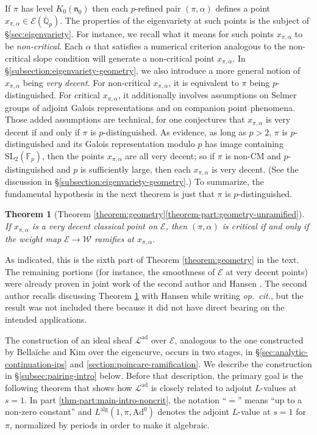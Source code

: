\documentclass[10pt, twoside]{amsart}
\theoremstyle{plain}
\newtheorem{theorem}{Theorem}
\theoremstyle{definition}
\theoremstyle{remark}
\numberwithin{equation}{subsection}
\def\F{\mathbb{F}}
\def\SL{\mathrm{SL}}
\def\Ad{\mathrm{Ad}}
\def\alg{\mathrm{alg}}
\def\ad{\operatorname{ad}}
\def\gn{\mathfrak n}
\def\scre{\mathscr E}
\def\scrl{\mathscr L}
\def\scrw{\mathscr W}
\def\qpbar{\overline{\mathbb Q}_p}
\begin{document}
If $\pi$ has level $K_0(\gn_0)$ then each $p$-refined pair $(\pi,\alpha)$ defines a point $x_{\pi,\alpha} \in \scre(\qpbar)$. The properties of the eigenvariety at such points is the subject of  \S\ref{sec:eigenvariety}. For instance, we recall what it means for such points $x_{\pi,\alpha}$ to be {\em non-critical}. Each $\alpha$ that satisfies a numerical criterion analogous to the non-critical slope condition will generate a non-critical point $x_{\pi,\alpha}$. In \S\ref{subsection:eigenvariety-geometry}, we also introduce a more general notion of $x_{\pi,\alpha}$ being {\em very decent}. For non-critical $x_{\pi,\alpha}$, it is equivalent to $\pi$ being $p$-distinguished. For critical $x_{\pi,\alpha}$, it additionally involves assumptions on Selmer groups of adjoint Galois representations and on companion point phenomena. Those added assumptions are technical, for one conjectures that $x_{\pi,\alpha}$ is very decent if and only if $\pi$ is $p$-distinguished. As evidence, as long as $p>2$, $\pi$ is $p$-distinguished and its Galois representation modulo $p$ has image containing $\SL_2(\F_p)$, then the points $x_{\pi,\alpha}$ are all very decent; so if $\pi$ is non-CM and $p$-distinguished and $p$ is sufficiently large, then each $x_{\pi,\alpha}$ is very decent. (See the discussion in \S\ref{subsection:eigenvariety-geometry}.) To summarize, the fundamental hypothesis in the next theorem is just that $\pi$ is $p$-distinguished.

\begin{theorem}[Theorem \ref{theorem:geometry}\ref{theorem-part:geometry-unramified}]\label{thm:geometric-intro-theorem}
If $x_{\pi,\alpha}$ is a very decent classical point on $\scre$, then $(\pi,\alpha)$ is critical if and only if the weight map $\scre \rightarrow \scrw$ ramifies at $x_{\pi,\alpha}$.
\end{theorem}

As indicated, this is the sixth part of Theorem \ref{theorem:geometry} in the text. The remaining portions (for instance, the smoothness of $\scre$ at very decent points) were already proven in joint work of the second author and Hansen \cite{BH}. The second author recalls discussing Theorem \ref{thm:geometric-intro-theorem} with Hansen while writing {\em op.\ cit.}, but the result was not included there because it did not have direct bearing on the intended applications.

The construction of an ideal sheaf $\scrl^{\ad}$ over $\scre$, analogous to the one constructed by Bella\"iche and Kim over the eigencurve, occurs in two stages, in \S\ref{sec:analytic-continuation-ips} and \ref{section:poincare-ramification}. We describe the construction in \S\ref{subsec:pairing-intro} below. Before that description, the primary goal is the following theorem that shows how $\scrl^{\ad}$ is closely related to adjoint $L$-values at $s = 1$. In part \ref{thm-part:main-intro-noncrit}, the notation ``$\overset{\cdot}{=}$'' means ``up to a non-zero constant'' and $L^{\alg}(1,\pi,\Ad^0)$ denotes the adjoint $L$-value at $s = 1$ for $\pi$, normalized by periods in order to make it algebraic.
\end{document}

